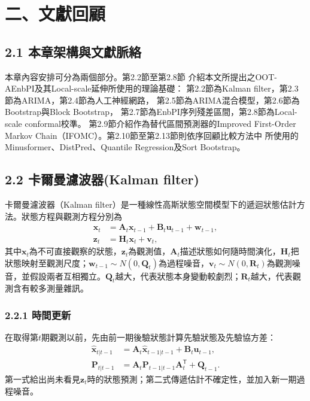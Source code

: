 \chapter*{二、文獻回顧}

\section*{2.1 本章架構與文獻脈絡}

本章內容安排可分為兩個部分。第2.2節至第2.8節
介紹本文所提出之OOT-AEnbPI及其Local-scale延伸所使用的理論基礎：
第2.2節為Kalman filter，第2.3節為ARIMA，第2.4節為人工神經網路，
第2.5節為ARIMA混合模型，第2.6節為Bootstrap與Block Bootstrap，
第2.7節為EnbPI序列殘差區間，第2.8節為Local-scale conformal校準。
第2.9節介紹作為替代區間預測器的Improved First-Order Markov
Chain（IFOMC）。第2.10節至第2.13節則依序回顧比較方法中
所使用的Minusformer、DistPred、Quantile Regression及Sort
Bootstrap。

\section*{2.2 卡爾曼濾波器(Kalman filter)}

卡爾曼濾波器（Kalman filter）是一種線性高斯狀態空間模型下的遞迴狀態估計方法\cite{kalman1960,welch1995}。狀態方程與觀測方程分別為
\begin{align}
 \boldsymbol{x}_t
 &=\boldsymbol{A}_t\boldsymbol{x}_{t-1}
 +\boldsymbol{B}_t\boldsymbol{u}_{t-1}
 +\boldsymbol{w}_{t-1},\\
 \boldsymbol{z}_t
 &=\boldsymbol{H}_t\boldsymbol{x}_t+\boldsymbol{v}_t,
\end{align}
其中$\boldsymbol{x}_t$為不可直接觀察的狀態，$\boldsymbol{z}_t$為觀測值，$\boldsymbol A_t$描述狀態如何隨時間演化，$\boldsymbol H_t$把狀態映射至觀測尺度；$\boldsymbol{w}_{t-1}\sim N(0,\boldsymbol Q_t)$為過程噪音，$\boldsymbol{v}_t\sim N(0,\boldsymbol R_t)$為觀測噪音，並假設兩者互相獨立。$\boldsymbol Q_t$越大，代表狀態本身變動較劇烈；$\boldsymbol R_t$越大，代表觀測含有較多測量雜訊。

\subsection*{2.2.1 時間更新}

在取得第$t$期觀測以前，先由前一期後驗狀態計算先驗狀態及先驗協方差：
\begin{align}
 \widehat{\boldsymbol{x}}_{t|t-1}
 &=\boldsymbol A_t\widehat{\boldsymbol{x}}_{t-1|t-1}
 +\boldsymbol B_t\boldsymbol u_{t-1},\\
\boldsymbol P_{t|t-1}
 &=\boldsymbol A_t\boldsymbol P_{t-1|t-1}\boldsymbol A_t^{\mathsf T}
 +\boldsymbol Q_{t-1}.
\end{align}
第一式給出尚未看見$\boldsymbol z_t$時的狀態預測；第二式傳遞估計不確定性，並加入新一期過程噪音。

